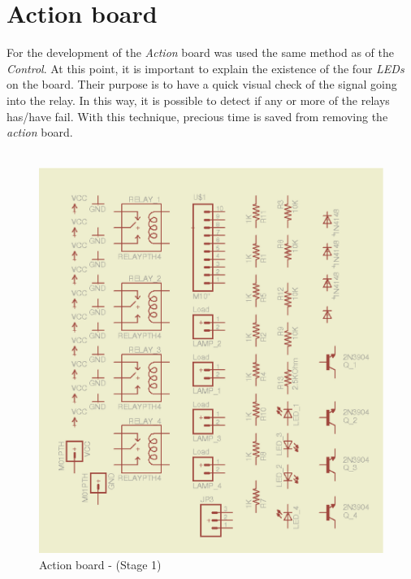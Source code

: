 \documentclass[12pt,a4paper]{report}
\begin{document}
\section{Action board}
For the development of the \textit{Action} board was used the same method as of the \textit{Control}. At this point, it is important to explain the existence of the four \textit{LEDs} on the board. Their purpose is to have a quick visual check of the signal going into the relay. In this way, it is possible to detect if any or more of the relays has/have fail. With this technique, precious time is saved from removing the \textit{action} board. \\
\ \\
\begin{figure}[H]
\centering
\includegraphics*[scale=0.25]{action_brd_s1}
\caption{Action board -  (Stage 1)}
\label{Action-brd-s1}
\end{figure}
\ \\
\end{document}
